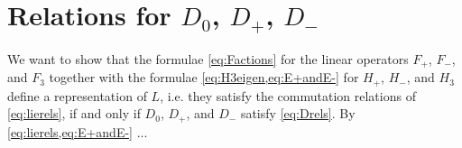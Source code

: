 \section{\texorpdfstring{Relations for $D_0$, $D_+$, $D_-$}{Relations for D\_0,D\_+,D\_-}}

We want to show that the formulae \cref{eq:Factions} for the linear operators $F_+$, $F_-$, and $F_3$ together with the formulae \cref{eq:H3eigen,eq:E+andE-} for $H_+$, $H_-$, and $H_3$ define a representation of $L$, i.e. they satisfy the commutation relations of \cref{eq:lierels}, if and only if $D_0$, $D_+$, and $D_-$ satisfy \cref{eq:Drels}.
By \cref{eq:lierels,eq:E+andE-} ...
